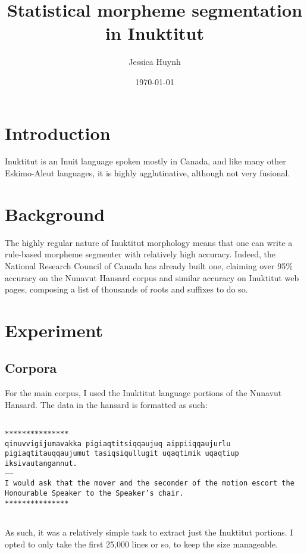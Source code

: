 \documentclass[10pt]{article}
\title{Statistical morpheme segmentation in Inuktitut}
\author{Jessica Huynh}
\date{\today}
\begin{document}
	
\maketitle

\onehalfspacing

\section{Introduction}
Inuktitut is an Inuit language spoken mostly in Canada, and like many other Eskimo-Aleut languages, it is highly agglutinative, although not very fusional.\cite{syllabics}

\section{Background}
The highly regular nature of Inuktitut morphology means that one can write a rule-based morpheme segmenter with relatively high accuracy. Indeed, the National Research Council of Canada has already built one, claiming over 95\% accuracy on the Nunavut Hansard corpus and similar accuracy on Inuktitut web pages, composing a list of thousands of roots and suffixes to do so.\cite{analyzer}

\section{Experiment}

\subsection{Corpora}
For the main corpus, I used the Inuktitut language portions of the Nunavut Hansard.\cite{hansard} The data in the hansard is formatted as such:

\texttt{~\\***************\\qinuvvigijumavakka pigiaqtitsiqqaujuq aippiiqqaujurlu pigiaqtitauqqaujumut tasiqsiqullugit uqaqtimik uqaqtiup iksivautangannut.\\-----\\I would ask that the mover and the seconder of the motion escort the Honourable Speaker to the Speaker's chair.\\***************\\~}

As such, it was a relatively simple task to extract just the Inuktitut portions. I opted to only take the first 25,000 lines or so, to keep the size manageable.
\end{document}
